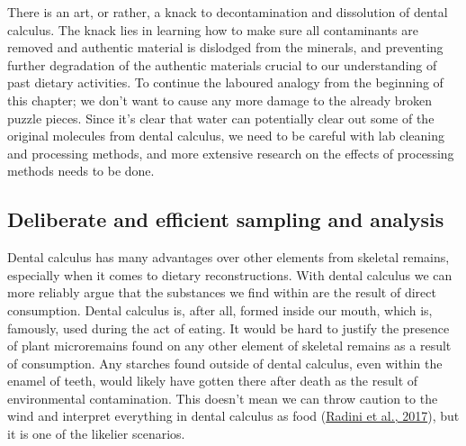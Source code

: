 \documentclass[
  b5paper,
]{book}
\begin{document}
There is an art, or rather, a knack to decontamination and dissolution
of dental calculus. The knack lies in learning how to make sure all
contaminants are removed and authentic material is dislodged from the
minerals, and preventing further degradation of the authentic materials
crucial to our understanding of past dietary activities. To continue the
laboured analogy from the beginning of this chapter; we don't want to
cause any more damage to the already broken puzzle pieces. Since it's
clear that water can potentially clear out some of the original
molecules from dental calculus, we need to be careful with lab cleaning
and processing methods, and more extensive research on the effects of
processing methods needs to be done.

\hypertarget{deliberate-and-efficient-sampling-and-analysis}{%
\subsection{Deliberate and efficient sampling and
analysis}\label{deliberate-and-efficient-sampling-and-analysis}}

Dental calculus has many advantages over other elements from skeletal
remains, especially when it comes to dietary reconstructions. With
dental calculus we can more reliably argue that the substances we find
within are the result of direct consumption. Dental calculus is, after
all, formed inside our mouth, which is, famously, used during the act of
eating. It would be hard to justify the presence of plant microremains
found on any other element of skeletal remains as a result of
consumption. Any starches found outside of dental calculus, even within
the enamel of teeth, would likely have gotten there after death as the
result of environmental contamination. This doesn't mean we can throw
caution to the wind and interpret everything in dental calculus as food
(\protect\hyperlink{ref-radiniFoodPathways2017}{Radini et al., 2017}),
but it is one of the likelier scenarios.
\end{document}
